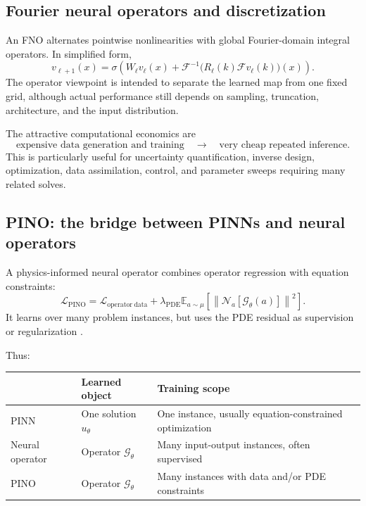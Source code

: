 \documentclass[11pt]{article}
\newcommand{\E}{\mathbb{E}}
\newcommand{\G}{\mathcal{G}}
\newcommand{\N}{\mathcal{N}}
\begin{document}
\subsection{Fourier neural operators and discretization}

An FNO alternates pointwise nonlinearities with global Fourier-domain integral operators. In simplified form,
\begin{equation}
 v_{\ell+1}(x)
 =\sigma\left(W_\ell v_\ell(x)
 +\mathcal{F}^{-1}\bigl(R_\ell(k)\mathcal{F}v_\ell(k)\bigr)(x)\right).
\end{equation}
The operator viewpoint is intended to separate the learned map from one fixed grid, although actual performance still depends on sampling, truncation, architecture, and the input distribution.

The attractive computational economics are
\[
\text{expensive data generation and training}
\quad\longrightarrow\quad
\text{very cheap repeated inference}.
\]
This is particularly useful for uncertainty quantification, inverse design, optimization, data assimilation, control, and parameter sweeps requiring many related solves.

\subsection{PINO: the bridge between PINNs and neural operators}

A physics-informed neural operator combines operator regression with equation constraints:
\begin{equation}
\mathcal{L}_{\mathrm{PINO}}
=\mathcal{L}_{\mathrm{operator\ data}}
+\lambda_{\mathrm{PDE}}
\E_{a\sim\mu}
\left[
\left\|\N_a[\G_\theta(a)]\right\|^2
\right].
\end{equation}
It learns over many problem instances, but uses the PDE residual as supervision or regularization \citep{li2021pino}.

Thus:
\begin{center}
\begin{tabularx}{\textwidth}{@{}P{0.18\textwidth}Y Y@{}}
\toprule
& \textbf{Learned object} & \textbf{Training scope} \\
\midrule
PINN & One solution \(u_\theta\) & One instance, usually equation-constrained optimization \\
Neural operator & Operator \(\G_\theta\) & Many input-output instances, often supervised \\
PINO & Operator \(\G_\theta\) & Many instances with data and/or PDE constraints \\
\bottomrule
\end{tabularx}
\end{center}
\end{document}
